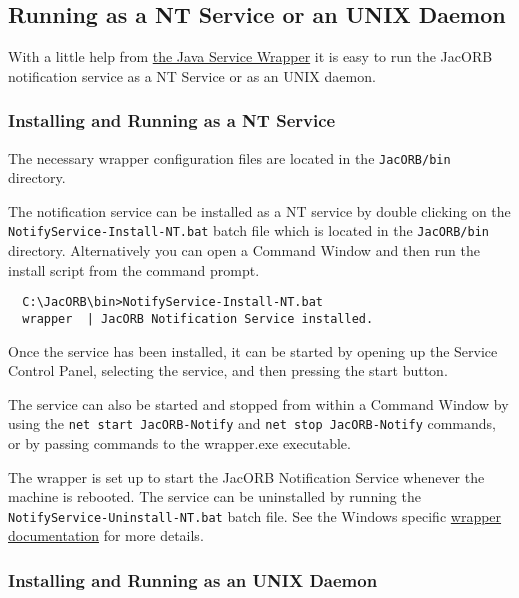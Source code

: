 \subsection{Running as a NT Service or an UNIX Daemon}
\label{sec:runn-notif-serv-1}

With a little help from
\href{http://wrapper.tanukisoftware.org}{the Java Service Wrapper} it is
easy to run the JacORB notification service as a NT Service or as
an UNIX daemon.

\subsubsection{Installing and Running as a NT Service}
\label{sec:windows-service}

The necessary wrapper configuration files are located in the
\texttt{JacORB/bin} directory.

The notification service can be installed as a NT service by double
clicking on the \texttt{NotifyService-Install-NT.bat} batch file which
is located in the \texttt{JacORB/bin} directory.
Alternatively you can open a Command Window and then run the install
script from the command prompt.

\begin{verbatim}
  C:\JacORB\bin>NotifyService-Install-NT.bat
  wrapper  | JacORB Notification Service installed.
\end{verbatim}

Once the service has been installed, it can be started by opening up
the Service Control Panel, selecting the service, and then pressing
the start button.

The service can also be started and stopped from within a Command
Window by using the \texttt{net start JacORB-Notify} and \texttt{net
  stop JacORB-Notify} commands, or
by passing commands to the wrapper.exe executable.

The wrapper is set up to start the JacORB Notification Service
whenever the machine is rebooted. The service can be uninstalled by running the
\texttt{NotifyService-Uninstall-NT.bat} batch file. See the Windows specific
\href{http://wrapper.tanukisoftware.org/doc/english/launch-win.html}{wrapper
  documentation} for more details.

\subsubsection{Installing and Running as an UNIX Daemon}
\label{sec:inst-runn-as}


